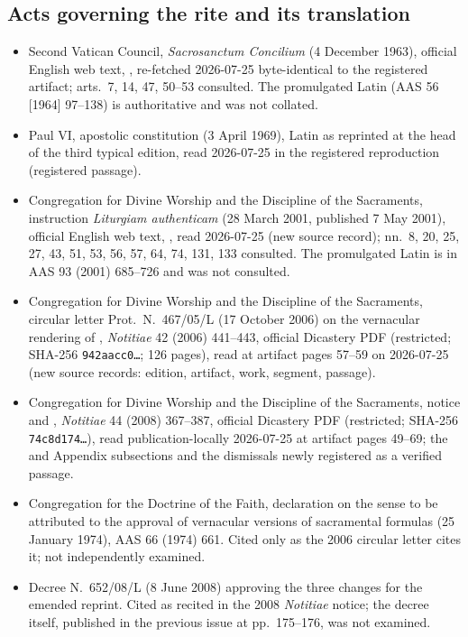\subsection*{Acts governing the rite and its translation}

{\fontsize{8.6}{9.6}\selectfont
\begin{itemize}[itemsep=0pt,parsep=0pt,topsep=0.05em]
\item Second Vatican Council, \emph{Sacrosanctum Concilium} (4 December 1963), official English
web text,
,
re-fetched 2026-07-25 byte-identical to the registered artifact; arts.\ 7, 14, 47, 50--53
consulted. The promulgated Latin (AAS 56 [1964] 97--138) is authoritative and was not collated.
\item Paul VI, apostolic constitution  (3 April 1969), Latin as reprinted
at the head of the third typical edition, read 2026-07-25 in the registered reproduction
(registered passage).
\item Congregation for Divine Worship and the Discipline of the Sacraments, instruction
\emph{Liturgiam authenticam} (28 March 2001, published 7 May 2001), official English web text,
,
read 2026-07-25 (new source record); nn.\ 8, 20, 25, 27, 43, 51, 53, 56, 57, 64, 74, 131, 133
consulted. The promulgated Latin is in AAS 93 (2001) 685--726 and was not consulted.
\item Congregation for Divine Worship and the Discipline of the Sacraments, circular letter
Prot.\ N.\ 467/05/L (17 October 2006) on the vernacular rendering of ,
\emph{Notitiae} 42 (2006) 441--443, official Dicastery PDF (restricted; SHA-256
\texttt{942aacc0\ldots}; 126 pages), read at artifact pages 57--59 on 2026-07-25 (new source
records: edition, artifact, work, segment, passage).
\item Congregation for Divine Worship and the Discipline of the Sacraments, notice
 and , \emph{Notitiae} 44
(2008) 367--387, official Dicastery PDF (restricted; SHA-256 \texttt{74c8d174\ldots}), read
publication-locally 2026-07-25 at artifact pages 49--69; the  and Appendix
subsections and the  dismissals newly registered as a verified passage.
\item Congregation for the Doctrine of the Faith, declaration on the sense to be attributed to
the approval of vernacular versions of sacramental formulas (25 January 1974), AAS 66 (1974)
661. Cited only as the 2006 circular letter cites it; not independently examined.
\item Decree N.\ 652/08/L (8 June 2008) approving the three changes for the emended reprint.
Cited as recited in the 2008 \emph{Notitiae} notice; the decree itself, published in the previous
issue at pp.\ 175--176, was not examined.
\end{itemize}}

